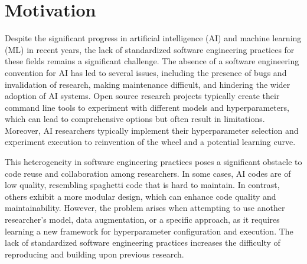 
\section{Motivation}

Despite the significant progress in artificial intelligence (AI) and machine learning (ML) in recent years, the lack of standardized software engineering practices for these fields remains a significant challenge. The absence of a software engineering convention for AI  has led to several issues, including the presence of bugs and invalidation of research, making maintenance difficult, and hindering the wider adoption of AI systems. Open source research projects typically create their command line tools to experiment with different models and hyperparameters, which can lead to comprehensive options but often result in limitations. Moreover, AI  researchers typically implement their hyperparameter selection and experiment execution to reinvention of the wheel and a potential learning curve.

This heterogeneity in software engineering practices poses a significant obstacle to code reuse and collaboration among researchers. In some cases, AI codes are of low quality, resembling spaghetti code that is hard to maintain. In contrast, others exhibit a more modular design, which can enhance code quality and maintainability. However, the problem arises when attempting to use another researcher's model, data augmentation, or a specific approach, as it requires learning a new framework for hyperparameter configuration and execution. The lack of standardized software engineering practices increases the difficulty of reproducing and building upon previous research.



